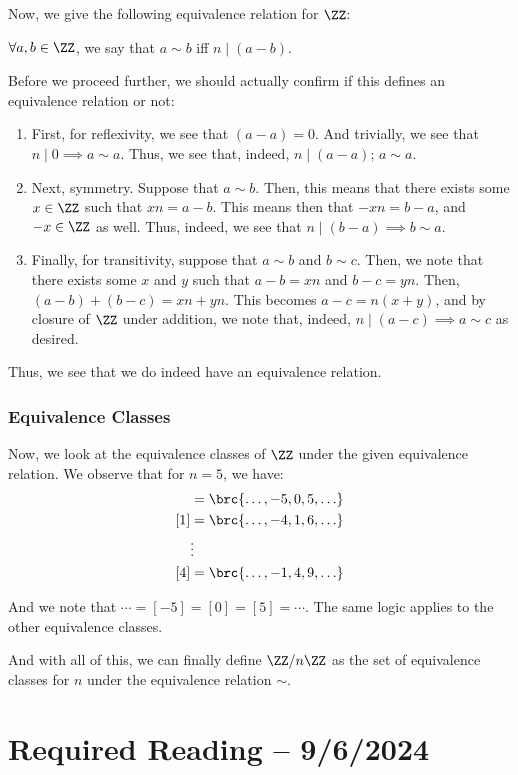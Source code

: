 \documentclass[openany]{book}
\begin{document}
Now, we give the following equivalence relation for $\ZZ$:
\begin{defn}
	$\forall a, b \in \ZZ$, we say that $a \sim b$ iff $n \mid (a - b)$.
\end{defn}

Before we proceed further, we should actually confirm if this defines an equivalence relation or not:
\begin{enumerate}
	\item First, for reflexivity, we see that $(a - a) = 0$. And trivially, we see that $n \mid 0 \implies a \sim a$.
	Thus, we see that, indeed, $n \mid (a - a)$; $a \sim a$.
	\item Next, symmetry. Suppose that $a \sim b$. Then, this means that there exists some $x \in \ZZ$ such that $xn = a - b$. This means then that $-xn = b - a$, and $-x \in \ZZ$ as well. Thus, indeed, we see that $n \mid (b - a) \implies b \sim a$.
	\item Finally, for transitivity, suppose that $a \sim b$ and $b \sim c$. Then, we note that there exists some $x$ and $y$ such that $a - b = xn$ and $b - c = yn$. Then, $(a - b) + (b - c) = xn + yn$. This becomes $a - c = n(x + y)$, and by closure of $\ZZ$ under addition, we note that, indeed, $n \mid (a - c) \implies a \sim c$ as desired.
\end{enumerate}

Thus, we see that we do indeed have an equivalence relation.

\subsubsection{Equivalence Classes}
Now, we look at the equivalence classes of $\ZZ$ under the given equivalence relation. We observe that for $n = 5$, we have:
\begin{align*}
	[0] &= \brc{\ldots, -5, 0, 5, \ldots} \\
	[1] &= \brc{\ldots, -4, 1, 6, \ldots} \\
	&\vdots \\
	[4] &= \brc{\ldots, -1, 4, 9, \ldots}
\end{align*}

And we note that $\cdots = [-5] = [0] = [5] = \cdots$. The same logic applies to the other equivalence classes.

And with all of this, we can finally define $\ZZ / n \ZZ$ as the set of equivalence classes for $n$ under the equivalence relation $\sim$. 

\section{Required Reading -- 9/6/2024}
\end{document}
